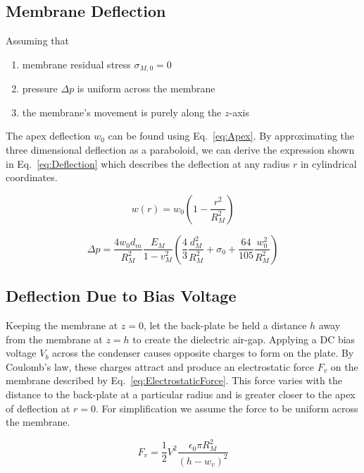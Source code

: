 \documentclass[journal]{IEEEtran}
\begin{document}
\subsection{Membrane Deflection}

Assuming that
\begin{enumerate}
	\item membrane residual stress $\sigma_{M,0}=0$
	\item pressure $\Delta p$ is uniform across the membrane
	\item the membrane's movement is purely along the $z$-axis
\end{enumerate}

The apex deflection $w_0$ can be found using Eq.~\ref{eq:Apex}.\supercite{schomburg} By approximating the three dimensional deflection as a paraboloid, we can derive the expression shown in Eq.~\ref{eq:Deflection} which describes the deflection at any radius $r$ in cylindrical coordinates.

\begin{figure}[ht]
	\begin{equation}
		w(r) = w_0\left(1-\frac{r^2}{R_M^2}\right)
		\label{eq:Deflection}
	\end{equation}
	
	\begin{equation}
		\Delta p = \frac{4w_0 d_m}{R_M^2} \frac{E_M}{1-v_M^2} \left( \frac{4}{3} \frac{d_M^2}{R_M^2} + \sigma_0 + \frac{64}{105} \frac{w_0^2}{R_M^2} \right)
		\label{eq:Apex}
	\end{equation}
\end{figure}


\subsection{Deflection Due to Bias Voltage}

Keeping the membrane at $z=0$, let the back-plate be held a distance $h$ away from the membrane at $z=h$ to create the dielectric air-gap. Applying a DC bias voltage $V_b$ across the condenser causes opposite charges to form on the plate. By Coulomb's law, these charges attract and produce an electrostatic force $F_v$ on the membrane described by Eq.~\ref{eq:ElectrostaticForce}.\supercite{aip} This force varies with the distance to the back-plate at a particular radius and is greater closer to the apex of deflection at $r=0$. For simplification we assume the force to be uniform across the membrane.

\begin{figure}[ht]
	\begin{equation}
		F_v = \frac{1}{2}V^2\frac{\epsilon_0\pi R_M^2}{(h-w_v)^2}
		\label{eq:ElectrostaticForce}
	\end{equation}
\end{figure}
\end{document}
